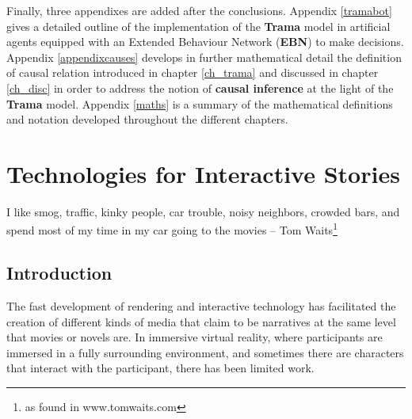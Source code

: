 \documentclass[
		twoside,openright,titlepage,numbers=noenddot,manychapters,
		headinclude,%
                footinclude=false,cleardoublepage=empty,
                BCOR=5mm,
		fontsize=11pt, %
                 enabledeprecatedfontcommands]{scrreprt}
\begin{document}
Finally, three appendixes are added after the conclusions. Appendix 
\ref{tramabot} gives a detailed outline of the implementation of the \textbf{Trama} model in artificial agents equipped with an Extended Behaviour Network (\textbf{EBN}) to make decisions. Appendix \ref{appendixcauses}  develops in further mathematical detail the definition of causal relation introduced in chapter \ref{ch_trama} and discussed in  chapter \ref{ch_disc} in order to address the notion of \textbf{causal inference} at the light of the \textbf{Trama} model. Appendix  \ref{maths} is a summary of the mathematical definitions and notation developed throughout the different chapters.


\cleardoublepage



\chapter{Technologies for Interactive Stories}
\thispagestyle{empty}

\label{ch_soa}

\begin{origquote}
I like smog, traffic, kinky people, car trouble, noisy neighbors, crowded bars, and spend most of my time in my car going to the movies -- Tom Waits\footnote{as found in www.tomwaits.com}
\end{origquote}



\section{Introduction}

The fast development of rendering and interactive technology has facilitated the creation of different kinds of media that claim  to be narratives at the same level that movies or novels are.  In immersive virtual reality, where participants are immersed in a fully surrounding environment, and sometimes there are characters that interact with the participant, there has been limited work.
\end{document}
